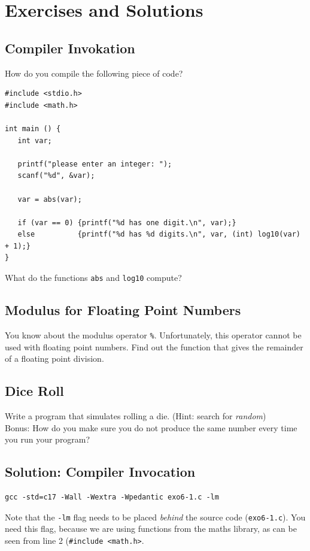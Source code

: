 \newpage
\section{Exercises and Solutions}
\subsection*{Compiler Invokation}
How do you compile the following piece of code?
\begin{codebox}[exo6-1.c]
\begin{verbatim}
#include <stdio.h>
#include <math.h>

int main () {
   int var;

   printf("please enter an integer: ");
   scanf("%d", &var);

   var = abs(var);

   if (var == 0) {printf("%d has one digit.\n", var);}
   else          {printf("%d has %d digits.\n", var, (int) log10(var) + 1);}
}
\end{verbatim}
\end{codebox}
What do the functions \texttt{abs} and \texttt{log10} compute?

\subsection*{Modulus for Floating Point Numbers}
You know about the modulus operator \texttt{\%}. Unfortunately, this operator cannot be used with floating point numbers. Find out the function that gives the remainder of a floating point division.

\subsection*{Dice Roll}
Write a program that simulates rolling a die. (Hint: search for \emph{random})\\
Bonus: How do you make sure you do not produce the same number every time you run your program?


\newpage


\subsection*{Solution: Compiler Invocation}
\begin{cmdbox}
\begin{verbatim}
gcc -std=c17 -Wall -Wextra -Wpedantic exo6-1.c -lm
\end{verbatim}
\end{cmdbox}
Note that the \texttt{-lm} flag needs to be placed \emph{behind} the source code (\texttt{exo6-1.c}). You need this flag, because we are using functions from the maths library, as can be seen from line 2 (\texttt{\#include <math.h>}.

